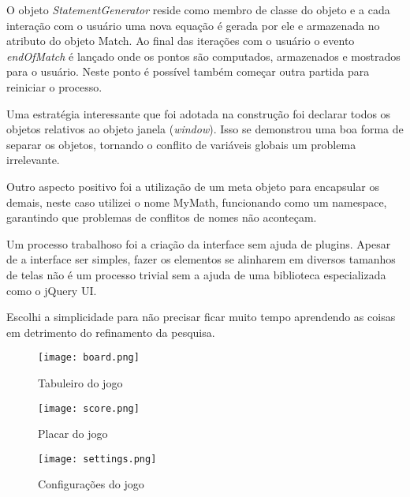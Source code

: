 \begin{draft}
O objeto \textit{StatementGenerator} reside como membro de classe
do objeto  e a cada interação com o usuário
uma nova equação é gerada por ele e armazenada no atributo
 do objeto Match. Ao final das iterações com
o usuário o evento \textit{endOfMatch} é lançado onde os pontos são
computados, armazenados e mostrados para o usuário. Neste ponto é
possível também começar outra partida para reiniciar o processo.

Uma estratégia interessante que foi adotada na construção foi
declarar todos os objetos relativos ao objeto janela (\textit{window}).
Isso se demonstrou uma boa forma de separar os objetos, tornando o
conflito de variáveis globais um problema irrelevante.

Outro aspecto positivo foi a utilização de um meta objeto para
encapsular os demais, neste caso utilizei o nome MyMath, funcionando
como um namespace, garantindo que problemas de conflitos de nomes não
aconteçam.

Um processo trabalhoso foi a criação da interface sem ajuda de plugins.
Apesar de a interface ser simples, fazer os elementos se alinharem em 
diversos tamanhos de telas não é um processo trivial sem a ajuda de uma
biblioteca especializada como o jQuery UI.

Escolhi a simplicidade para não precisar ficar muito tempo aprendendo
as coisas em detrimento do refinamento da pesquisa.


\end{draft}
\begin{figure}
    \centering
    \texttt{[image: board.png]}
	\caption{Tabuleiro do jogo}
\end{figure}

\begin{figure}
    \centering
    \texttt{[image: score.png]}
	\caption{Placar do jogo}
\end{figure}

\begin{figure}
    \centering
    \texttt{[image: settings.png]}
	\caption{Configurações do jogo}
\end{figure}

